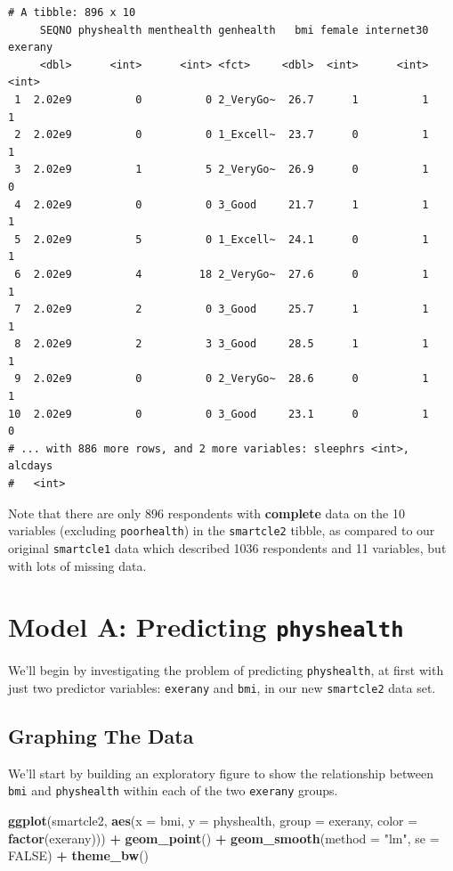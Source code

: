 \documentclass[]{book}
\newenvironment{Shaded}{\begin{snugshade}}{\end{snugshade}}
\newcommand{\KeywordTok}[1]{\textcolor[rgb]{0.13,0.29,0.53}{\textbf{#1}}}
\newcommand{\DataTypeTok}[1]{\textcolor[rgb]{0.13,0.29,0.53}{#1}}
\newcommand{\StringTok}[1]{\textcolor[rgb]{0.31,0.60,0.02}{#1}}
\newcommand{\OtherTok}[1]{\textcolor[rgb]{0.56,0.35,0.01}{#1}}
\newcommand{\OperatorTok}[1]{\textcolor[rgb]{0.81,0.36,0.00}{\textbf{#1}}}
\newcommand{\NormalTok}[1]{#1}
\theoremstyle{definition}
\theoremstyle{definition}
\theoremstyle{definition}
\theoremstyle{remark}
\begin{document}
\begin{verbatim}
# A tibble: 896 x 10
     SEQNO physhealth menthealth genhealth   bmi female internet30 exerany
     <dbl>      <int>      <int> <fct>     <dbl>  <int>      <int>   <int>
 1  2.02e9          0          0 2_VeryGo~  26.7      1          1       1
 2  2.02e9          0          0 1_Excell~  23.7      0          1       1
 3  2.02e9          1          5 2_VeryGo~  26.9      0          1       0
 4  2.02e9          0          0 3_Good     21.7      1          1       1
 5  2.02e9          5          0 1_Excell~  24.1      0          1       1
 6  2.02e9          4         18 2_VeryGo~  27.6      0          1       1
 7  2.02e9          2          0 3_Good     25.7      1          1       1
 8  2.02e9          2          3 3_Good     28.5      1          1       1
 9  2.02e9          0          0 2_VeryGo~  28.6      0          1       1
10  2.02e9          0          0 3_Good     23.1      0          1       0
# ... with 886 more rows, and 2 more variables: sleephrs <int>, alcdays
#   <int>
\end{verbatim}

Note that there are only 896 respondents with \textbf{complete} data on
the 10 variables (excluding \texttt{poorhealth}) in the
\texttt{smartcle2} tibble, as compared to our original
\texttt{smartcle1} data which described 1036 respondents and 11
variables, but with lots of missing data.

\section{\texorpdfstring{Model A: Predicting
\texttt{physhealth}}{Model A: Predicting physhealth}}\label{model-a-predicting-physhealth}

We'll begin by investigating the problem of predicting
\texttt{physhealth}, at first with just two predictor variables:
\texttt{exerany} and \texttt{bmi}, in our new \texttt{smartcle2} data
set.

\subsection{Graphing The Data}\label{graphing-the-data}

We'll start by building an exploratory figure to show the relationship
between \texttt{bmi} and \texttt{physhealth} within each of the two
\texttt{exerany} groups.

\begin{Shaded}
\begin{Highlighting}[]
\KeywordTok{ggplot}\NormalTok{(smartcle2, }\KeywordTok{aes}\NormalTok{(}\DataTypeTok{x =}\NormalTok{ bmi, }\DataTypeTok{y =}\NormalTok{ physhealth, }\DataTypeTok{group =}\NormalTok{ exerany, }\DataTypeTok{color =} \KeywordTok{factor}\NormalTok{(exerany))) }\OperatorTok{+}
\StringTok{    }\KeywordTok{geom_point}\NormalTok{() }\OperatorTok{+}
\StringTok{    }\KeywordTok{geom_smooth}\NormalTok{(}\DataTypeTok{method =} \StringTok{"lm"}\NormalTok{, }\DataTypeTok{se =} \OtherTok{FALSE}\NormalTok{) }\OperatorTok{+}\StringTok{ }
\StringTok{    }\KeywordTok{theme_bw}\NormalTok{()}
\end{Highlighting}
\end{Shaded}
\end{document}
